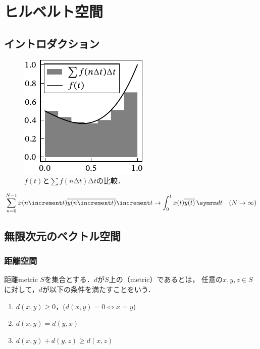 \documentclass[../../main]{subfiles}
\begin{document}
\chapter{ヒルベルト空間}
\label{chapter:hilbert_space}

\section{イントロダクション}

\begin{figure}[htbp]
  \centering
  \includegraphics{figures/riemann_sum.pdf}
  \caption{\(f(t)\)と\(\sum f(n\increment t)\increment t\)の比較．}
\end{figure}

\[
  \sum_{n=0}^{N-1}x(n\increment t)\conj*{y(n\increment t)}\increment t \to \int_0^1x(t)\conj*{y(t)}\intd{t}\quad(N\to\infty)
\]

\pagebreak

\section{無限次元のベクトル空間}

\subsection{距離空間}

\begin{definition}{距離}{metric}
  \(S\)を集合とする．\(d\)が\(S\)上の（metric）であるとは，
  任意の\(x,y,z\in S\)に対して，\(d\)が以下の条件を満たすことをいう．
  \begin{enumerate}
    \item \(d(x,y)\geq 0\)，(\(d(x,y)=0\iff x=y\))
    \item \(d(x,y)=d(y,x)\)
    \item \(d(x,y)+d(y,z)\geq d(x,z)\)
  \end{enumerate}
\end{definition}
\end{document}
